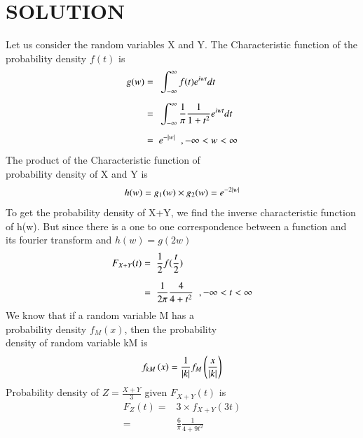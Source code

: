 \documentclass[journal,12pt,twocolumn]{IEEEtran}
\begin{document}
    \section*{SOLUTION}
    Let us consider the random variables X and Y.
    The Characteristic function of the probability density $f(t)$ is
    \begin{align}
        g(w) =\hspace{0.2cm} & \int_{-\infty}^{\infty}  f(t) {e}^{iwt} dt                                         \\[0.2cm]
        =\hspace{0.2cm}      & \int_{-\infty}^{\infty}  \displaystyle\frac{1}{\pi} \frac{1}{1+{t}^2} {e}^{iwt} dt \\[0.2cm]
        =\hspace{0.2cm}      & e^{-\vert w\vert}\hspace{0.2cm}, -\infty<w<\infty
    \end{align}
    The product of the Characteristic function of \\probability density of X and Y is
    \begin{align}
        h(w) = g_1(w) \times g_2(w) = {e}^{-2\vert w\vert}
    \end{align}
    To get the probability density of X+Y, we find the inverse characteristic function of h(w). But since there is a one to one correspondence between a function and its fourier transform and
$h(w) = g(2w)$
    \begin{align}
        F_{X+Y}(t) =\hspace{0.2cm} & \frac{1}{2}f(\frac{t}{2})                                        \\[0.2cm]
        =\hspace{0.2cm}            & \frac{1}{2\pi} \frac{4}{4+{t}^2} \hspace{0.2cm},-\infty<t<\infty
    \end{align}
    We know that if a random variable M has a\\probability density $f_M(x)$, then the probability \\density of random variable kM is
    \begin{align}
        f_{kM}\left(x\right) = \frac{1}{\vert k\vert} f_M\left(\frac{x}{\vert k\vert}\right)
    \end{align}
    Probability density of $Z = \displaystyle\frac{X+Y}{3}$ given $F_{X+Y}(t)$ is
\begin{align}
    F_{Z}(t) = & 3\times \displaystyle f_{X+Y}(3t) \\
    =          & \frac{6}{\pi} \frac{1}{4+9{t}^2}
\end{align}
\end{document}
